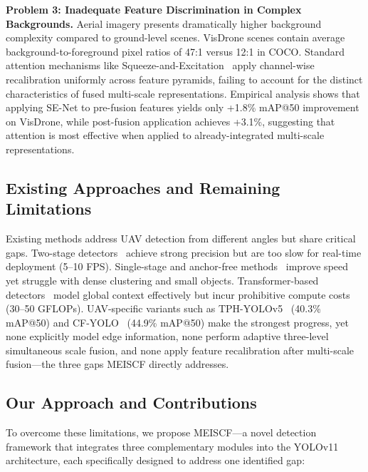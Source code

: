 \documentclass[preprint,12pt]{elsarticle}
\begin{document}
\textbf{Problem 3: Inadequate Feature Discrimination in Complex Backgrounds.}
Aerial imagery presents dramatically higher background complexity compared to
ground-level scenes. VisDrone scenes contain average background-to-foreground
pixel ratios of 47:1 versus 12:1 in COCO. Standard attention mechanisms like
Squeeze-and-Excitation~\cite{senet} apply channel-wise recalibration uniformly
across feature pyramids, failing to account for the distinct characteristics of
fused multi-scale representations. Empirical analysis shows that applying SE-Net
to pre-fusion features yields only +1.8\% mAP@50 improvement on VisDrone, while
post-fusion application achieves +3.1\%, suggesting that attention is most
effective when applied to already-integrated multi-scale representations.

\subsection{Existing Approaches and Remaining Limitations}

Existing methods address UAV detection from different angles but share critical
gaps. Two-stage detectors~\cite{cascade-rcnn,libra-rcnn} achieve strong precision
but are too slow for real-time deployment (5--10 FPS). Single-stage and
anchor-free methods~\cite{fcos,centernet,retinanet} improve speed yet struggle
with dense clustering and small objects. Transformer-based detectors~\cite{detr,
deformable-detr} model global context effectively but incur prohibitive compute
costs (30--50 GFLOPs). UAV-specific variants such as TPH-YOLOv5~\cite{tph-yolo}
(40.3\% mAP@50) and CF-YOLO~\cite{cf-yolo} (44.9\% mAP@50) make the strongest
progress, yet none explicitly model edge information, none perform adaptive
three-level simultaneous scale fusion, and none apply feature recalibration after
multi-scale fusion---the three gaps MEISCF directly addresses.

\subsection{Our Approach and Contributions}

To overcome these limitations, we propose MEISCF---a novel detection framework
that integrates three complementary modules into the YOLOv11 architecture, each
specifically designed to address one identified gap:
\end{document}
